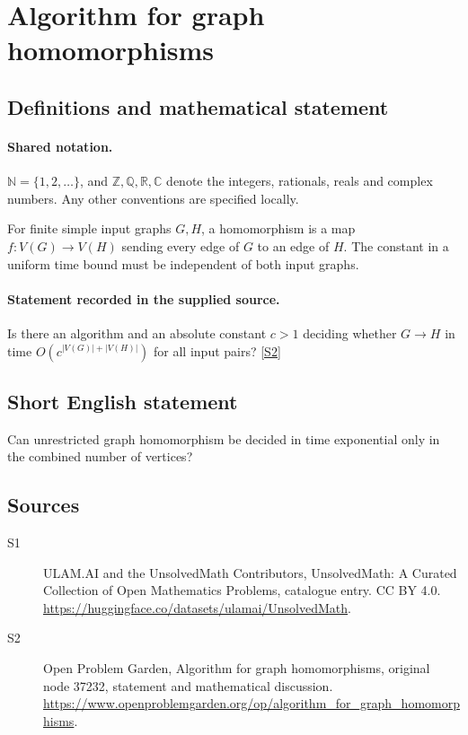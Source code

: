 \documentclass[11pt]{article}
\newcommand{\sref}[2]{\hyperlink{source:#1:#2}{[S#2]}}
\begin{document}
\section{Algorithm for graph homomorphisms}\label{statement}

\subsection{Definitions and mathematical statement}

\paragraph{Shared notation.}$\mathbb N=\{1,2,\ldots\}$, and $\mathbb Z,\mathbb Q,\mathbb R,\mathbb C$ denote the integers, rationals, reals and complex numbers. Any other conventions are specified locally.


For finite simple input graphs $G,H$, a homomorphism is a map $f:V(G)\to V(H)$ sending every edge of $G$ to an edge of $H$. The constant in a uniform time bound must be independent of both input graphs.
\paragraph{Statement recorded in the supplied source.}
Is there an algorithm and an absolute constant $c>1$ deciding whether $G\to H$ in time $O(c^{|V(G)|+|V(H)|})$ for all input pairs? \sref{statement}{2}
\subsection{Short English statement}
Can unrestricted graph homomorphism be decided in time exponential only in the combined number of vertices?
\subsection{Sources}
\begin{description}
\item[\hypertarget{source:statement:1}{S1}] ULAM.AI and the UnsolvedMath Contributors, UnsolvedMath: A Curated Collection of Open Mathematics Problems, catalogue entry. CC BY 4.0. \url{https://huggingface.co/datasets/ulamai/UnsolvedMath}.
\item[\hypertarget{source:statement:2}{S2}] Open Problem Garden, Algorithm for graph homomorphisms, original node 37232, statement and mathematical discussion. \url{https://www.openproblemgarden.org/op/algorithm_for_graph_homomorphisms}.
\end{description}
\label{end:statement}
\end{document}
